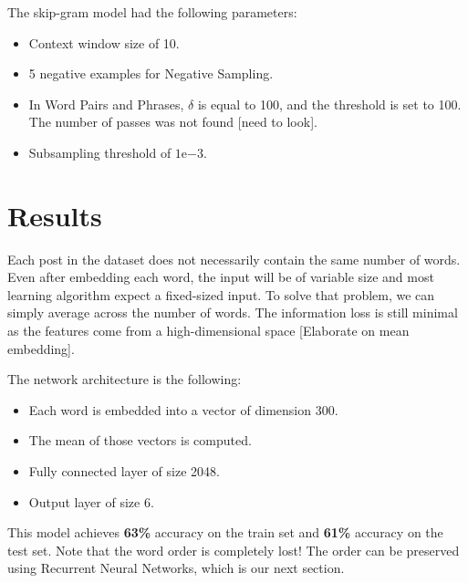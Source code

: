 The skip-gram model had the following parameters:
\begin{itemize}
    \item Context window size of 10.
    \item 5 negative examples for Negative Sampling.
    \item In Word Pairs and Phrases, $\delta$ is equal to 100, and the threshold is set to 100. The number of passes was not found [need to look].
    \item Subsampling threshold of $1\mathrm{e}{-3}.$
\end{itemize}

\section{Results}
Each post in the dataset does not necessarily contain the same number of words. Even after embedding each word, the input will be of variable size and most learning algorithm expect a fixed-sized input. To solve that problem, we can simply average across the number of words. The information loss is still minimal as the features come from a high-dimensional space \cite{seth1} [Elaborate on mean embedding].

The network architecture is the following:
\begin{itemize}
    \item Each word is embedded into a vector of dimension 300.
    \item The mean of those vectors is computed.
    \item Fully connected layer of size 2048.
    \item Output layer of size 6.
\end{itemize}
This model achieves \textbf{63\%} accuracy on the train set and \textbf{61\%} accuracy on the test set. Note that the word order is completely lost! The order can be preserved using Recurrent Neural Networks, which is our next section.





